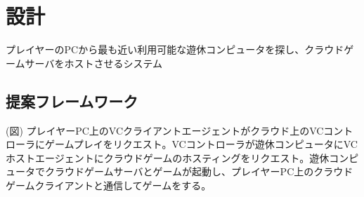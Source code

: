 \section{設計}

プレイヤーのPCから最も近い利用可能な遊休コンピュータを探し、クラウドゲームサーバをホストさせるシステム

\subsection{提案フレームワーク}
(図)
プレイヤーPC上のVCクライアントエージェントがクラウド上のVCコントローラにゲームプレイをリクエスト。VCコントローラが遊休コンピュータにVCホストエージェントにクラウドゲームのホスティングをリクエスト。遊休コンピュータでクラウドゲームサーバとゲームが起動し、プレイヤーPC上のクラウドゲームクライアントと通信してゲームをする。
